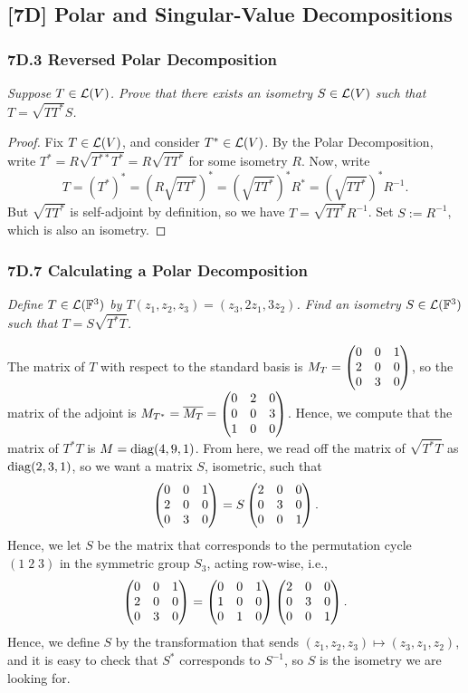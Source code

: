 \documentclass{article}
\begin{document}
\subsection*{[7D] Polar and Singular-Value Decompositions}
\subsubsection*{7D.3 Reversed Polar Decomposition}
\textit{Suppose $T\in\mathcal L(V)$. Prove that there exists an isometry $S\in\mathcal L(V)$ such that $T = \sqrt{TT^*}S$.}
\begin{proof}
Fix $T\in\mathcal L(V)$, and consider $T^*\in\mathcal L(V)$. By the Polar Decomposition, write $T^* = R\sqrt{T^{**}T^*} = R\sqrt{TT^*}$ for some isometry $R$. Now, write
$$T = (T^*)^* = (R\sqrt{TT^*})^* = (\sqrt{TT^*})^*R^* = (\sqrt{TT^*})^*R^{-1}.$$
But $\sqrt{TT^{*}}$ is self-adjoint by definition, so we have $T = \sqrt{TT^*}R^{-1}$. Set $S := R^{-1}$, which is also an isometry.
\end{proof}
\subsubsection*{7D.7 Calculating a Polar Decomposition}
\textit{Define $T\in\mathcal L(\mathbb F^3)$ by $T(z_1,z_2,z_3) = (z_3, 2z_1, 3z_2)$. Find an isometry $S\in\mathcal L(\mathbb F^3)$ such that $T = S\sqrt{T^*T}$.}
\begin{solution}
The matrix of $T$ with respect to the standard basis is $M_T = \begin{pmatrix}0 & 0 & 1 \\ 2 & 0 & 0 \\ 0 & 3 & 0 \end{pmatrix}$, so the matrix of the adjoint is $M_{T^*} = \overline{M_T} = \begin{pmatrix}0 & 2 & 0 \\ 0 & 0 & 3 \\ 1 & 0 & 0 \end{pmatrix}$. Hence, we compute that the matrix of $T^*T$ is $M = \operatorname{diag}(4, 9, 1)$. From here, we read off the matrix of $\sqrt{T^*T}$ as $\operatorname{diag}(2,3,1)$, so we want a matrix $S$, isometric, such that
$$\begin{pmatrix}0 & 0 & 1 \\ 2 & 0 & 0 \\ 0 & 3 & 0 \end{pmatrix} = S\begin{pmatrix}2 & 0 & 0 \\ 0 & 3 & 0 \\ 0 & 0 & 1 \end{pmatrix}.$$
Hence, we let $S$ be the matrix that corresponds to the permutation cycle $(1\;2\;3)$ in the symmetric group $S_3$, acting row-wise, i.e.,
$$\begin{pmatrix}0 & 0 & 1 \\ 2 & 0 & 0 \\ 0 & 3 & 0 \end{pmatrix} = \begin{pmatrix}0 & 0 & 1 \\ 1 & 0 & 0 \\ 0 & 1 & 0 \end{pmatrix} \begin{pmatrix}2 & 0 & 0 \\ 0 & 3 & 0 \\ 0 & 0 & 1 \end{pmatrix}.$$
Hence, we define $S$ by the transformation that sends $(z_1, z_2, z_3) \mapsto (z_3, z_1, z_2)$, and it is easy to check that $S^*$ corresponds to $S^{-1}$, so $S$ is the isometry we are looking for.
\end{solution}
\end{document}
